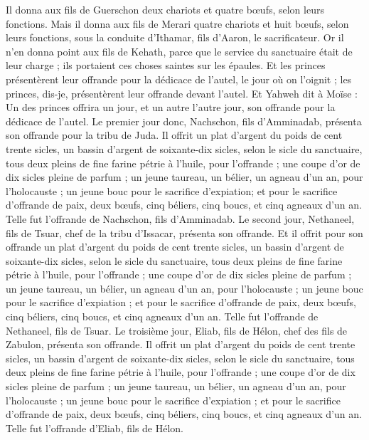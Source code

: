 \begin{multicols}{2}
Il donna aux fils de Guerschon deux chariots et quatre bœufs, selon leurs fonctions.
Mais il donna aux fils de Merari quatre chariots et huit bœufs, selon leurs fonctions, sous la conduite d'Ithamar, fils d'Aaron, le sacrificateur.
Or il n'en donna point aux fils de Kehath, parce que le service du sanctuaire était de leur charge ; ils portaient ces choses saintes sur les épaules.
Et les princes présentèrent leur offrande pour la dédicace de l'autel, le jour où on l'oignit ; les princes, dis-je, présentèrent leur offrande devant l'autel.
Et Yahweh dit à Moïse : Un des princes offrira un jour, et un autre l'autre jour, son offrande pour la dédicace de l'autel.
Le premier jour donc, Nachschon, fils d'Amminadab, présenta son offrande pour la tribu de Juda.
Il offrit un plat d'argent du poids de cent trente sicles, un bassin d'argent de soixante-dix sicles, selon le sicle du sanctuaire, tous deux pleins de fine farine pétrie à l'huile, pour l'offrande ;
une coupe d'or de dix sicles pleine de parfum ;
un jeune taureau, un bélier, un agneau d'un an, pour l'holocauste ;
un jeune bouc pour le sacrifice d'expiation;
et pour le sacrifice d'offrande de paix, deux bœufs, cinq béliers, cinq boucs, et cinq agneaux d'un an. Telle fut l'offrande de Nachschon, fils d'Amminadab.
Le second jour, Nethaneel, fils de Tsuar, chef de la tribu d'Issacar, présenta son offrande.
Et il offrit pour son offrande un plat d'argent du poids de cent trente sicles, un bassin d'argent de soixante-dix sicles, selon le sicle du sanctuaire, tous deux pleins de fine farine pétrie à l'huile, pour l'offrande ;
une coupe d'or de dix sicles pleine de parfum ;
un jeune taureau, un bélier, un agneau d'un an, pour l'holocauste ;
un jeune bouc pour le sacrifice d'expiation ;
et pour le sacrifice d'offrande de paix, deux bœufs, cinq béliers, cinq boucs, et cinq agneaux d'un an. Telle fut l'offrande de Nethaneel, fils de Tsuar.
Le troisième jour, Eliab, fils de Hélon, chef des fils de Zabulon, présenta son offrande.
Il offrit un plat d'argent du poids de cent trente sicles, un bassin d'argent de soixante-dix sicles, selon le sicle du sanctuaire, tous deux pleins de fine farine pétrie à l'huile, pour l'offrande ;
une coupe d'or de dix sicles pleine de parfum ;
un jeune taureau, un bélier, un agneau d'un an, pour l'holocauste ;
un jeune bouc pour le sacrifice d'expiation ;
et pour le sacrifice d'offrande de paix, deux bœufs, cinq béliers, cinq boucs, et cinq agneaux d'un an. Telle fut l'offrande d'Eliab, fils de Hélon.

\end{multicols}
